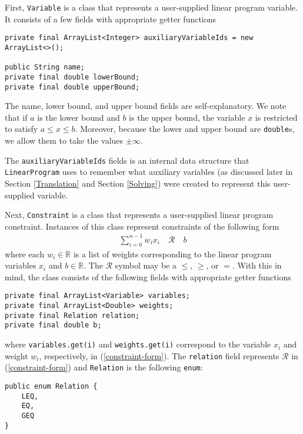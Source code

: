 \documentclass{article}
\newcommand{\javaCode}[1]{\texttt{#1}}
\begin{document}
First, \javaCode{Variable} is a class that represents a user-supplied linear program variable. It consists of a few fields with appropriate getter functions
\begin{verbatim}
private final ArrayList<Integer> auxiliaryVariableIds = new ArrayList<>();

public String name;
private final double lowerBound;
private final double upperBound;
\end{verbatim}
The name, lower bound, and upper bound fields are self-explanatory. We note that if $a$ is the lower bound and $b$ is the upper bound, the variable $x$ is restricted to satisfy $a \leq x \leq b$. Moreover, because the lower and upper bound are \javaCode{double}s, we allow them to take the values $\pm \infty$.

The \javaCode{auxiliaryVariableIds} fields is an internal data structure that \javaCode{LinearProgram} uses to remember what auxiliary variables (as discussed later in Section \ref{Translation} and Section \ref{Solving}) were created to represent this user-supplied variable.


Next, \javaCode{Constraint} is a class that represents a user-supplied linear program constraint. Instances of this class represent constraints of the following form
\begin{align} \label{constraint-form}
    \sum_{i=0}^{n-1} w_i x_i \quad \mathcal{R} \quad b
\end{align}
where each $w_i \in \mathbb{R}$ is a list of weights corresponding to the linear program variables $x_i$ and $b \in \mathbb{R}$. The $\mathcal{R}$ symbol may be a $\leq$, $\geq$, or $=$. With this in mind, the class consists of the following fields with appropriate getter functions
\begin{verbatim}
private final ArrayList<Variable> variables;
private final ArrayList<Double> weights;
private final Relation relation;
private final double b;
\end{verbatim}
where \javaCode{variables.get(i)} and \javaCode{weights.get(i)} correspond to the variable $x_i$ and weight $w_i$, respectively, in (\ref{constraint-form}). The \javaCode{relation} field represents $\mathcal{R}$ in (\ref{constraint-form}) and \javaCode{Relation} is the following \javaCode{enum}:
\begin{verbatim}
public enum Relation {
    LEQ,
    EQ,
    GEQ
}
\end{verbatim}
\end{document}
